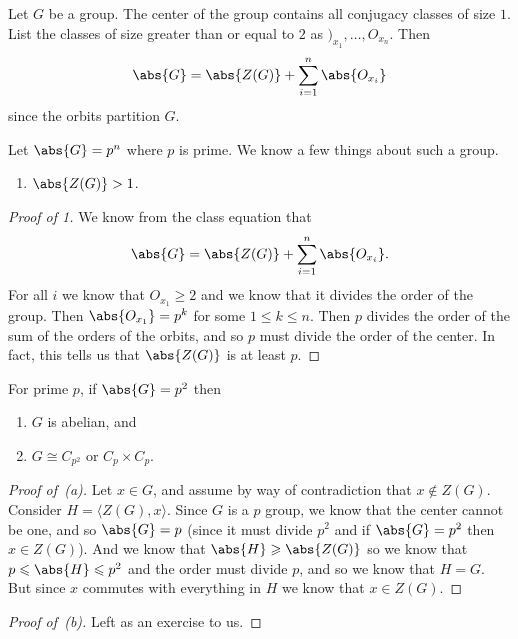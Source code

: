 \begin{theorem}
Let $G$ be a group. The center of the group contains all conjugacy classes of size $1$. List the classes of size greater than or equal to $2$ as $)_{x_1} ,\dotsc,O_{x_n}$. Then 
\[ \abs{G} = \abs{Z(G)} + \sum_{i=1}^n \abs{O_{x_i}} \]
since the orbits partition $G$.
\end{theorem}

\begin{theorem}
Let $\abs{G} = p^n$ where $p$ is prime. We know a few things about such a group.
\begin{enumerate}
\item $\abs{Z(G)} > 1$.
\end{enumerate}
\end{theorem}

\begin{proof}[Proof of 1]
We know from the class equation that \[ \abs{G} = \abs{Z(G)} + \sum_{i=1}^n \abs{O_{x_i}}. \] For all $i$ we know that $O_{x_1} \geqslant 2$ and we know that it divides the order of the group. Then $\abs{O_{x_1}} = p^k$ for some $1 \leqslant k \leqslant n$. Then $p$ divides the order of the sum of the orders of the orbits, and so $p$ must divide the order of the center. In fact, this tells us that $\abs{Z(G)}$ is at least $p$.
\end{proof}

\begin{proposition}
For prime $p$, if $\abs{G} = p^2$ then
\begin{enumerate}
\item[(a)] $G$ is abelian, and 
\item[(b)] $G \cong C_{p^2}$ or $C_p \times C_p$.
\end{enumerate}
\end{proposition}

\begin{proof}[Proof of~\textup{(a)}]
Let $x \in G$, and assume by way of contradiction that $x \notin Z(G)$. Consider $H = \langle Z(G), x \rangle$. Since $G$ is a $p$ group, we know that the center cannot be one, and so $\abs{G} = p$ (since it must divide $p^2$ and if $\abs{G} = p^2$ then $x \in Z(G)$). And we know that $\abs{H} \geqslant \abs{Z(G)}$ so we know that $p \leqslant \abs{H} \leqslant p^2$ and the order must divide $p$, and so we know that $H = G$. But since $x$ commutes with everything in $H$ we know that $x \in Z(G)$.
\end{proof}

\begin{proof}[Proof of~\textup{(b)}]
Left as an exercise to us.
\end{proof}

